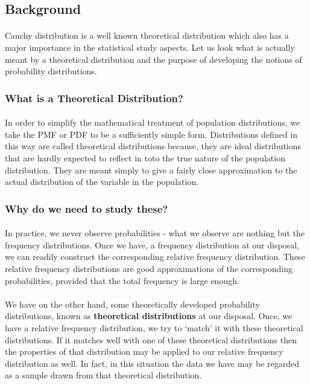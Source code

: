 \documentclass[12pt, fleqn, a4paper]{article}
\begin{document}
	\subsection{Background}
	\paragraph{} Cauchy distribution is a well known theoretical distribution which also has a major importance in the statistical study aspects. Let us look what is actually meant by a theoretical distribution and the purpose of developing the notions of probability distributions.
	
	\subsubsection*{What is a Theoretical Distribution?}
	\paragraph{} In order to simplify the mathematical treatment of population distributions, we take the PMF or PDF to be a sufficiently simple form. Distributions defined in this way are called theoretical distributions because, they are ideal distributions that are hardly expected to reflect in toto the true nature of the population distribution. They are meant simply to give a fairly close approximation to the actual distribution of the variable in the population.
	
	\subsubsection*{Why do we need to study these?}
	\paragraph{} In practice, we never observe probabilities - what we observe are nothing but the frequency distributions. Once we have, a frequency distribution at our disposal, we can readily construct the corresponding relative frequency distribution. These relative frequency distributions are good approximations of the corresponding probabilities, provided that the total frequency is large enough. 
	\paragraph{} We have on the other hand, some theoretically developed probability distributions, known as \textbf{theoretical distributions} at our disposal. Once, we have a relative frequency distribution, we try to `match' it with these theoretical distributions. If it matches well with one of these theoretical distributions then the properties of that distribution may be applied to our relative frequency distribution as well. In fact, in this situation the data we have may be regarded as a sample drawn from that theoretical distribution.
	
\end{document}
